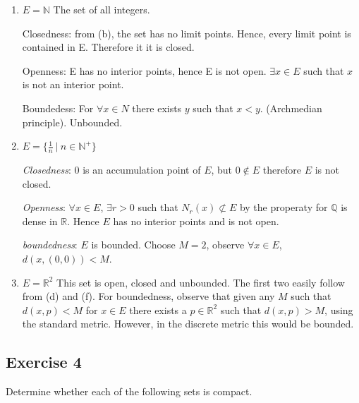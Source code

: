 \documentclass{tufte-book}
\theoremstyle{mytheoremstyle}
\theoremstyle{mylemstyle}
\theoremstyle{mydefstyle}
\begin{document}
\begin{enumerate}

\item $E = \mathbb{N}$ The set of all integers.

Closedness:  from (b), the set has no limit points.  Hence, every limit point is contained in E.  Therefore it it is closed.

Openness: E has no interior points, hence E is not open. $\exists x \in E$ such that $x$ is not an interior point.

Boundedess:  For $\forall x \in N$ there exists $y$ such that $x<y$.  (Archmedian principle).  Unbounded.

\item $E = \{\frac{1}{n} \ | \ n \in \mathbb{N}^+ \}$

\textit{Closedness}: $0$ is an accumulation point of $E$, but $0 \notin E$ therefore $E$ is not closed.

\textit{Openness}: $\forall x \in E$, $\exists r > 0$ such that $N_r(x) \not\subset E$ by the properaty for $\mathbb{Q}$ is dense in $\mathbb{R}$.  Hence $E$ has no interior points and is not open.

\textit{boundedness}:   $E$ is bounded.  Choose $M=2$, observe $\forall x \in E$, $d(x, (0,0)) < M$.

\item $E= \mathbb{R}^2$
This set is open, closed and unbounded.  The first two easily follow from (d) and (f).  For boundedness, observe that given any $M$ such that $d(x, p) < M$ for $x \in E$ there exists a $p \in \mathbb{R}^2$ such that $d(x,p) > M$, using the standard metric.  However, in the discrete metric this would be bounded.
\end{enumerate}

\subsection{Exercise 4}
Determine whether each of the following sets is compact.
\end{document}
